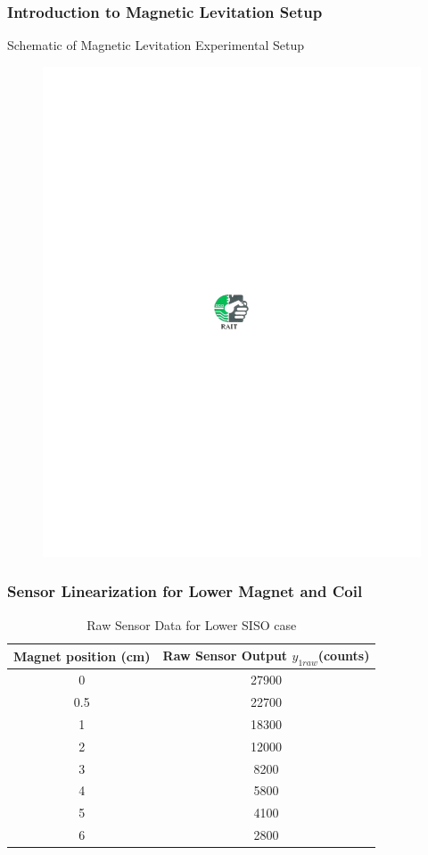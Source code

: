 \documentclass{beamer}
\begin{document}
\begin{frame}
\frametitle{Introduction to Magnetic Levitation Setup} Schematic of
Magnetic Levitation Experimental Setup
\begin{figure}[tbh]
\begin{center}
\includegraphics[width= 2.5 in]{raitlogo.pdf}
\end{center}
\end{figure}
\end{frame}

\begin{frame}
\frametitle{Sensor Linearization for Lower Magnet and Coil}
\begin{table}
  \centering
  \caption{Raw Sensor Data for Lower SISO case}
  \begin{tabular}{|c|c|}
\hline
    \textbf{Magnet position (cm)} & \textbf{Raw Sensor Output $y_{1raw}$(counts)} \\ \hline
    0 & 27900 \\ \hline
    0.5 & 22700 \\ \hline
    1 & 18300 \\ \hline
    2 & 12000 \\ \hline
    3 & 8200 \\ \hline
    4 & 5800 \\ \hline
    5 & 4100 \\ \hline
    6 & 2800 \\ \hline
  \end{tabular}
\end{table}
\end{frame}
\end{document}
